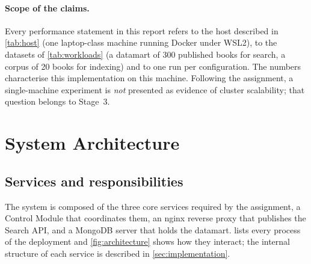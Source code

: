 \documentclass[10pt,a4paper]{article}
\newcommand{\fixed}[1]{#1}
\begin{document}
\paragraph{Scope of the claims.}
Every performance statement in this report refers to the host described in
\cref{tab:host} (one laptop-class machine running Docker under WSL2), to the
datasets of \cref{tab:workloads} (a datamart of \fixed{300} published books for
search, a corpus of \fixed{20} books for indexing) and to one run per
configuration. The numbers characterise this implementation on this machine.
Following the assignment, a single-machine experiment is \emph{not} presented
as evidence of cluster scalability; that question belongs to Stage~3.

\section{System Architecture}
\label{sec:architecture}

\subsection{Services and responsibilities}
\label{sec:services}

The system is composed of the three core services required by the assignment,
a Control Module that coordinates them, an nginx reverse proxy that publishes
the Search API, and a MongoDB server that holds the datamart.
 lists every process of the deployment and
\cref{fig:architecture} shows how they interact; the internal structure of
each service is described in \cref{sec:implementation}.
\end{document}
